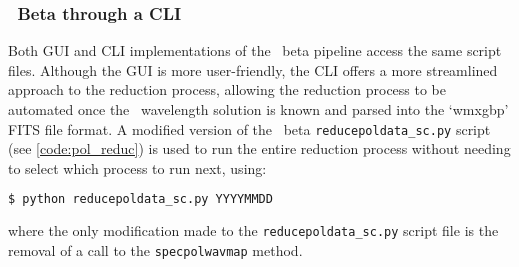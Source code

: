 

\subsubsection{\polsalt\ Beta through a \gls{CLI}}

Both \gls{GUI} and \gls{CLI} implementations of the \polsalt\ beta pipeline access the same script files.
Although the \gls{GUI} is more user-friendly, the \gls{CLI} offers a more streamlined approach to the reduction process, allowing the reduction process to be automated once the \iraf\ wavelength solution is known and parsed into the `wmxgbp' \gls{FITS} file format.
A modified version of the \polsalt\ beta \texttt{reducepoldata\_sc.py} script (see \autoref{code:pol_reduc}) is used to run the entire reduction process without needing to select which process to run next, using:
\begin{lstlisting}[language=bash]
$ python reducepoldata_sc.py YYYYMMDD
\end{lstlisting}
{\parskip=0pt where} the only modification made to the \texttt{reducepoldata\_sc.py} script file is the removal of a call to the \texttt{specpolwavmap} method.


